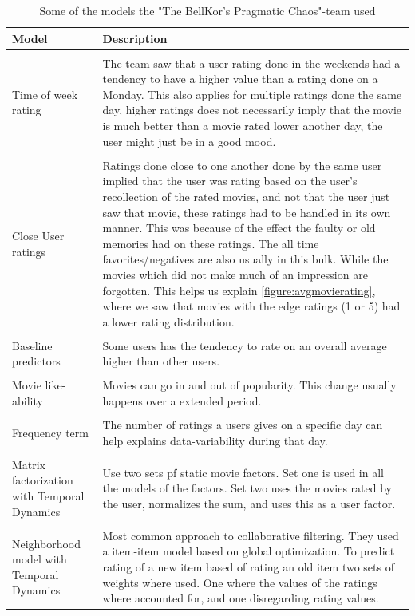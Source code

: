 \begin{table}[H]
\caption{Some of the models the "The BellKor's Pragmatic Chaos"-team used \cite{BellKor-PragmaticTheory}}
\centering
\begin{tabular}{ p{3.2cm} p{9cm} }
\hline
  \textbf{Model} & \textbf{Description}\\
  \hline \\ [-1.5ex]
  Time of week rating & The team saw that a user-rating done in the weekends had a tendency to have a higher value than a rating done on a Monday. This also applies for multiple ratings done the same day, higher ratings does not necessarily imply that the movie is much better than a movie rated lower another day, the user might just be in a good mood. \\
  \hline \\ [-1.5ex]
  Close User ratings & Ratings done close to one another done by the same user implied that the user was rating based on the user's recollection of the rated movies, and not that the user just saw that movie, these ratings had to be handled in its own manner. This was because of the effect the faulty or old memories had on these ratings. The all time favorites/negatives are also usually in this bulk. While the movies which did not make much of an impression are forgotten. This helps us explain \ref{figure:avgmovierating}, where we saw that movies with the edge ratings (1 or 5) had a lower rating distribution. \\
  \hline \\ [-1.5ex]
  Baseline predictors & Some users has the tendency to rate on an overall average higher than other users.\\
  \hline \\ [-1.5ex]
  Movie like-ability & Movies can go in and out of popularity. This change usually happens over a extended period. \\
  \hline \\ [-1.5ex]
  Frequency term & The number of ratings a users gives on a specific day can help explains data-variability during that day. \\
  \hline \\ [-1.5ex]
  Matrix factorization with Temporal Dynamics & Use two sets pf static movie factors. Set one is used in all the models of the factors. Set two uses the movies rated by the user, normalizes the sum, and uses this as a user factor. \\
  \hline \\ [-1.5ex]
  Neighborhood model with Temporal Dynamics & Most common approach to collaborative filtering. They used a item-item model based on global optimization. To predict rating of a new item based of rating an old item two sets of weights where used. One where the values of the ratings where accounted for, and one disregarding rating values.

\end{tabular}
\end{table}
